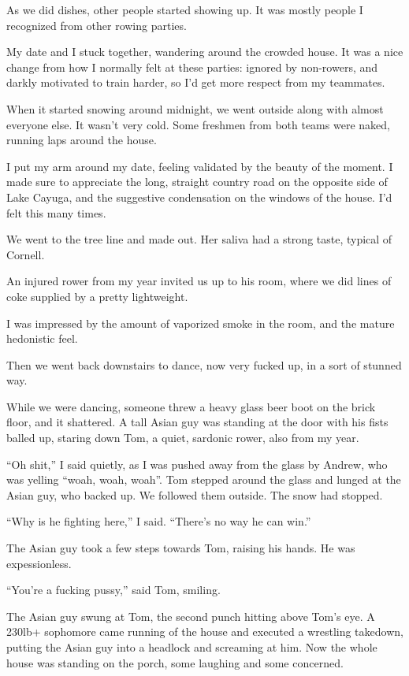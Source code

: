 As we did dishes, other people started showing up.  It was mostly people I
recognized from other rowing parties.  

My date and I stuck together, wandering around the crowded house. It was a nice
change from how I normally felt at these parties: ignored by non-rowers, and
darkly motivated to train harder, so I'd get more respect from my teammates.

When it started snowing around midnight, we went outside along with almost
everyone else.  It wasn't very cold.  Some freshmen from both teams were naked,
running laps around the house.

I put my arm around my date, feeling validated by the beauty of the moment.   I
made sure to appreciate the long, straight country road on the opposite side of
Lake Cayuga, and the suggestive condensation on the windows of the house.  I'd
felt this many times. 

We went to the tree line and made out.  Her saliva had a strong taste, typical
of Cornell.

An injured rower from my year invited us up to his room, where we did lines of
coke supplied by a pretty lightweight. 

I was impressed by the amount of vaporized smoke in the room, and the mature
hedonistic feel.  

Then we went back downstairs to dance, now very fucked up, in a sort of stunned
way.  

While we were dancing, someone threw a heavy glass beer boot on the brick floor,
and it shattered.  A tall Asian guy was standing at the door with his fists
balled up, staring down Tom, a quiet, sardonic rower, also from my year.  

``Oh shit,'' I said quietly, as I was pushed away from the glass by Andrew, who
was yelling ``woah, woah, woah''.  Tom stepped around the glass and lunged at the
Asian guy, who backed up. We followed them outside.  The snow had stopped.

``Why is he fighting here,'' I said.  ``There's no way he can win.'' 

The Asian guy took a few steps towards Tom, raising his hands.  He was
expessionless.

``You're a fucking pussy,'' said Tom, smiling. 

The Asian guy swung at Tom, the second punch hitting above Tom's eye.  A 230lb+
sophomore came running of the house and executed a wrestling takedown, putting
the Asian guy into a headlock and screaming at him.   Now the whole house was
standing on the porch, some laughing and some concerned.

